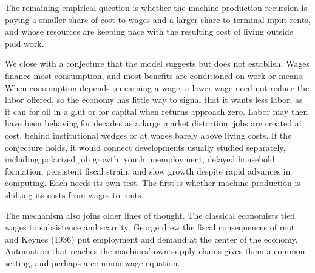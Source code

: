 \documentclass[12pt]{article}
\theoremstyle{plain}
\theoremstyle{definition}
\theoremstyle{remark}
\begin{document}
The remaining empirical question is whether the machine-production recursion
is paying a smaller share of cost to wages and a larger share to
terminal-input rents, and whose resources are keeping pace with the resulting cost of living outside paid work.

We close with a conjecture that the model suggests but does not establish. Wages finance most consumption, and most benefits are conditioned on work or means. When consumption depends on earning a wage, a lower wage need not reduce the labor offered, so the economy has little way to signal that it wants less labor, as it can for oil in a glut or for capital when returns approach zero. Labor may then have been behaving for decades as a large market distortion: jobs are created at cost, behind institutional wedges or at wages barely above living costs. If the conjecture holds, it would connect developments usually studied separately, including polarized job growth, youth unemployment, delayed household formation, persistent fiscal strain, and slow growth despite rapid advances in computing. Each needs its own test. The first is whether machine production is shifting its costs from wages to rents.

The mechanism also joins older lines of thought. The classical economists tied wages to subsistence and scarcity, George drew the fiscal consequences of rent, and Keynes (1936) put employment and demand at the center of the economy. Automation that reaches the machines' own supply chains gives them a common setting, and perhaps a common wage equation.
\end{document}

